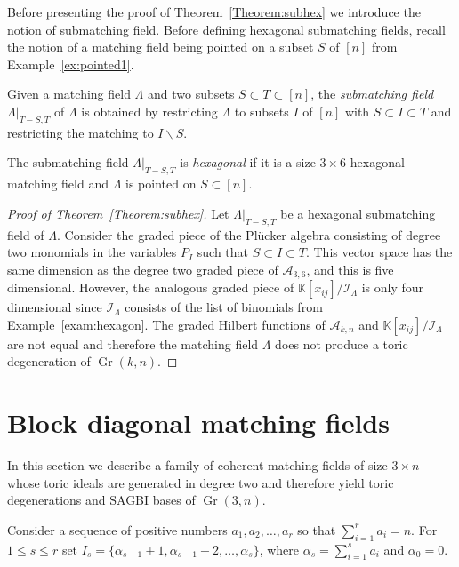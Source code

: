 \documentclass[ALCO,ThmDefs,Unicode,epreuves]{cedram}
\DeclareMathOperator{\Gr}{Gr}
\begin{document}
Before presenting the proof of Theorem~\ref{Theorem:subhex} we introduce the notion of submatching field. 
Before defining hexagonal submatching fields, recall the notion of a matching field being pointed on a subset $S$ of $[n]$ from Example~\ref{ex:pointed1}.

\begin{Definition}\label{def:submatching}
Given a matching field $\Lambda$ and two subsets $S \subset T \subset [n]$, the \emph{submatching field} $\Lambda|_{T-S,T}$ of $\Lambda$
is obtained by restricting $\Lambda$ to subsets $I$ of $[n]$ with $S\subset I\subset T$ and restricting the matching to $I \backslash S$.

The submatching field $\Lambda|_{T-S,T}$ is \emph{hexagonal} if it is a size $3 \times 6$ hexagonal matching field and $\Lambda$ is pointed on $S \subset [n]$. 
\end{Definition}



\begin{proof}[Proof of Theorem~\ref{Theorem:subhex}]
{Let $\Lambda|_{T-S,T}$ be a hexagonal submatching field of $\Lambda$. Consider the graded piece of the Pl{\"u}cker algebra consisting of degree two monomials in the variables $P_I$ such that $ S \subset I \subset T$. This vector space has the same dimension as the degree two graded piece of $\mathcal{A}_{3, 6}$, and this is five dimensional. However, the analogous graded piece of $\mathbb{K}[x_{ij}]/\mathcal{I}_{\Lambda}$ is only four dimensional since 
 $\mathcal{I}_{\Lambda}$ consists of the list of binomials from Example~\ref{exam:hexagon}. 
The graded Hilbert functions of $\mathcal{A}_{k, n}$ and $\mathbb{K}[x_{ij}]/\mathcal{I}_{\Lambda}$ are not equal and therefore the matching field $\Lambda$ does not produce a toric degeneration of $\Gr(k,n)$.} 
\end{proof}




\section{Block diagonal matching fields}\label{sec:block}

In this section we describe a family of coherent matching fields of size $3 \times n$ whose toric ideals are generated in degree two and therefore yield toric degenerations and SAGBI bases of $\Gr(3,n)$. 



Consider a sequence of positive numbers $ a_1, a_2, \ldots, a_{r}$ so that $\sum_{i = 1}^r a_i = n$. For $1 \leq s\leq r$ set 
$I_s = \{\alpha_{s-1}+1, \alpha_{s-1} +2, \ldots, \alpha_{s}\}$,
where $\alpha_{s} = \sum_{i = 1}^{s} a_{i }$ and $\alpha_0 = 0$. 
\end{document}
